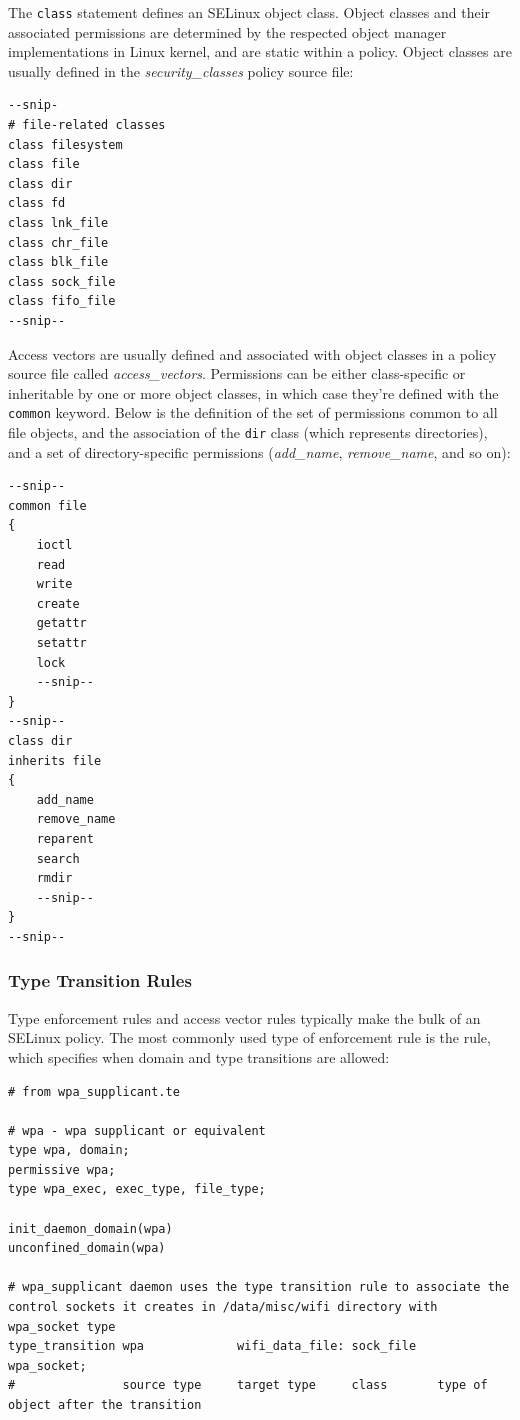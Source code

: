 The \texttt{class} statement defines an SELinux object class. Object classes and their associated permissions are determined by the respected object manager implementations in Linux kernel, and are static within a policy. Object classes are usually defined in the \textit{security\_classes} policy source file:
\begin{lstlisting}
--snip-
# file-related classes 
class filesystem 
class file 
class dir 
class fd 
class lnk_file 
class chr_file 
class blk_file 
class sock_file 
class fifo_file 
--snip--
\end{lstlisting}

Access vectors are usually defined and associated with object classes in a policy source file called \textit{access\_vectors}. Permissions can be either class-specific or inheritable by one or more object classes, in which case they're defined with the \texttt{common} keyword. Below is the definition of the set of permissions common to all file objects, and the association of the \texttt{dir} class (which represents directories), and a set of directory-specific permissions (\textit{add\_name}, \textit{remove\_name}, and so on):
\begin{lstlisting}
--snip--
common file 
{ 
    ioctl 
    read
    write 
    create 
    getattr 
    setattr 
    lock 
    --snip--
} 
--snip--
class dir 
inherits file 
{ 
    add_name 
    remove_name 
    reparent 
    search 
    rmdir 
    --snip--
}
--snip--
\end{lstlisting}

\subsubsection{Type Transition Rules}

Type enforcement rules and access vector rules typically make the bulk of an SELinux policy. The most commonly used type of enforcement rule is the  rule, which specifies when domain and type transitions are allowed:
\begin{lstlisting}
# from wpa_supplicant.te

# wpa - wpa supplicant or equivalent 
type wpa, domain; 
permissive wpa;
type wpa_exec, exec_type, file_type; 

init_daemon_domain(wpa)
unconfined_domain(wpa)

# wpa_supplicant daemon uses the type transition rule to associate the control sockets it creates in /data/misc/wifi directory with wpa_socket type
type_transition wpa             wifi_data_file: sock_file   wpa_socket;
#               source type     target type     class       type of object after the transition
\end{lstlisting}

